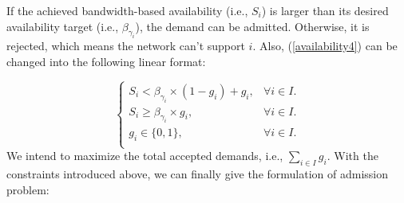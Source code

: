 \documentclass[sigconf]{acmart}
\begin{document}
\begin{appendices}
If the achieved bandwidth-based availability (i.e., $S_i$) is larger than its desired availability target (i.e., $\beta_{\gamma_{i}}$), the demand can be admitted.
Otherwise, it is rejected, which means the network can't support $i$.
Also,  (\ref{availability4}) can be changed into the following linear format:

\begin{equation}
\begin{cases}
S_i <  \beta_{\gamma_{i}}\times  (1-g_i)+g_i,& \forall i \in I. \\
S_i \ge  \beta_{\gamma_{i}} \times g_i,& \forall i \in I. \\
g_i\in\{0,1\},& \forall i \in I. \\
\end{cases}
\label{g-2}
\end{equation}
We intend to maximize the total accepted demands, i.e., $ \sum_{i\in I} g_i$.
With the constraints introduced above, we can finally give the formulation of admission problem:


\end{appendices}
\end{document}
